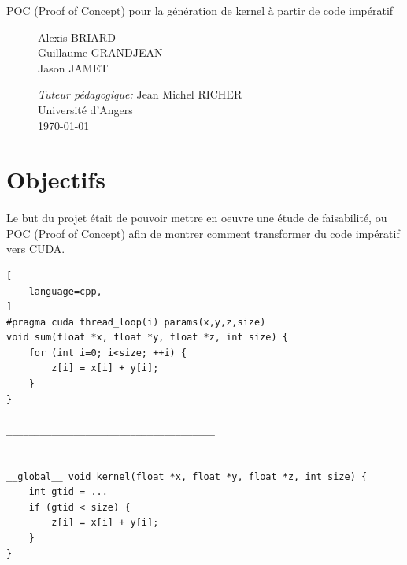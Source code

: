 \documentclass{article}
\begin{document}
\begin{titlepage}
\begin{center}
\begin{Huge}
			\end{Huge}
			\begin{Large}
				POC (Proof of Concept) pour la génération de kernel à partir de code impératif
			\end{Large}		
			 
		\end{center}
		
		
  		\begin{figure}[b]
  		 \begin{minipage}{0.4\textwidth}
			\begin{flushleft} \large
				Alexis BRIARD\\
				Guillaume GRANDJEAN\\
				Jason JAMET
    		\end{flushleft}
    		\end{minipage}
    		\begin{minipage}{0.6\textwidth}
			\begin{flushright} \large
				\emph{Tuteur pédagogique:} Jean Michel RICHER\\				
        		Université d'Angers\\
        		\today
    		\end{flushright}
    	\end{minipage}
		\end{figure}

    	
	\end{titlepage}



\newpage
\thispagestyle{empty}
\mbox{}
\setcounter{page}{0}
\glsresetall
\newpage
\tableofcontents
\newpage

	\section{Objectifs}

	\paragraph{}
	Le but du projet était de pouvoir mettre en oeuvre une étude de faisabilité, ou POC (Proof of Concept) afin de montrer comment transformer du code impératif vers CUDA.
	
	\begin{lstlisting}[
    language=cpp,
]
#pragma cuda thread_loop(i) params(x,y,z,size) 
void sum(float *x, float *y, float *z, int size) { 
	for (int i=0; i<size; ++i) {
		z[i] = x[i] + y[i];
	}
}

_____________________________________


__global__ void kernel(float *x, float *y, float *z, int size) { 
	int gtid = ...
	if (gtid < size) {
		z[i] = x[i] + y[i];
	}
}
	
	\end{lstlisting}	
	
\end{document}
